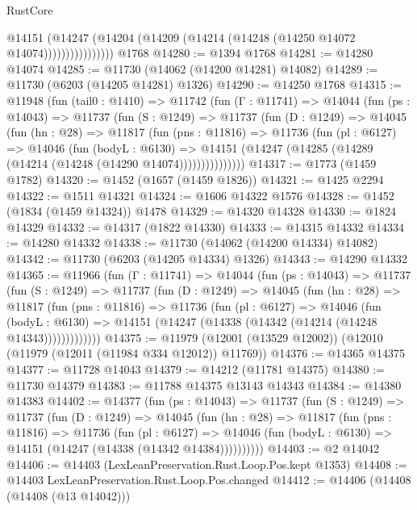 \begin{lexlean}{RustCore}
\begin{coremodule}
                      @14151
                        (@14247
                          (@14204 (@14209 (@14214 (@14248 (@14250 @14072 @14074))))))))))))))))
    @1768
@14280 := @1394 @1768
@14281 := @14280 @14074
@14285 := @11730 (@14062 (@14200 @14281) @14082)
@14289 := @11730 (@6203 (@14205 @14281) @1326)
@14290 := @14250 @1768
@14315 := @11948
    (fun (tail0 : @1410) =>
    @11742
      (fun (Γ : @11741) =>
      @14044
        (fun (ps : @14043) =>
        @11737
          (fun (S : @1249) =>
          @11737
            (fun (D : @1249) =>
            @14045
              (fun (hn : @28) =>
              @11817
                (fun (pns : @11816) =>
                @11736
                  (fun (pl : @6127) =>
                  @14046
                    (fun (bodyL : @6130) =>
                    @14151 (@14247 (@14285 (@14289 (@14214 (@14248 (@14290 @14074)))))))))))))))
@14317 := @1773 (@1459 @1782)
@14320 := @1452 (@1657 (@1459 @1826))
@14321 := @1425 @2294
@14322 := @1511 @14321
@14324 := @1606 @14322 @1576
@14328 := @1452 (@1834 (@1459 @14324)) @1478
@14329 := @14320 @14328
@14330 := @1824 @14329
@14332 := @14317 (@1822 @14330)
@14333 := @14315 @14332
@14334 := @14280 @14332
@14338 := @11730 (@14062 (@14200 @14334) @14082)
@14342 := @11730 (@6203 (@14205 @14334) @1326)
@14343 := @14290 @14332
@14365 := @11966
    (fun (Γ : @11741) =>
    @14044
      (fun (ps : @14043) =>
      @11737
        (fun (S : @1249) =>
        @11737
          (fun (D : @1249) =>
          @14045
            (fun (hn : @28) =>
            @11817
              (fun (pns : @11816) =>
              @11736
                (fun (pl : @6127) =>
                @14046
                  (fun (bodyL : @6130) =>
                  @14151 (@14247 (@14338 (@14342 (@14214 (@14248 @14343)))))))))))))
@14375 := @11979 (@12001 (@13529 @12002)) (@12010 (@11979 (@12011 (@11984 @334 @12012)) @11769))
@14376 := @14365 @14375
@14377 := @11728 @14043
@14379 := @14212 (@11781 @14375)
@14380 := @11730 @14379
@14383 := @11788 @14375 @13143 @14343
@14384 := @14380 @14383
@14402 := @14377
    (fun (ps : @14043) =>
    @11737
      (fun (S : @1249) =>
      @11737
        (fun (D : @1249) =>
        @14045
          (fun (hn : @28) =>
          @11817
            (fun (pns : @11816) =>
            @11736
              (fun (pl : @6127) =>
              @14046 (fun (bodyL : @6130) => @14151 (@14247 (@14338 (@14342 @14384))))))))))
@14403 := @2 @14042
@14406 := @14403 (LexLeanPreservation.Rust.Loop.Pos.kept @1353)
@14408 := @14403 LexLeanPreservation.Rust.Loop.Pos.changed
@14412 := @14406 (@14408 (@14408 (@13 @14042)))

\end{coremodule}
\end{lexlean}
